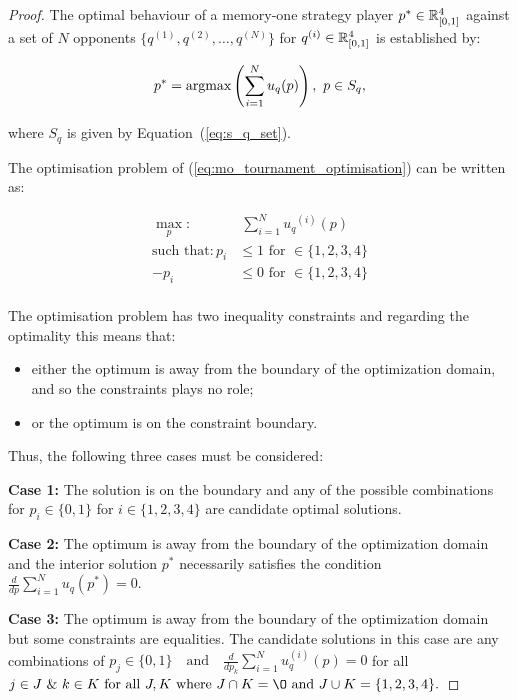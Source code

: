\begin{proof}
The optimal behaviour of a memory-one strategy player
\(p^* \in \mathbb{R}_{[0, 1]} ^ 4\)
against a set of \(N\) opponents \(\{q^{(1)}, q^{(2)}, \dots, q^{(N)} \}\)
for \(q^{(i)} \in \mathbb{R}_{[0, 1]} ^ 4\) is established by:

\[p^* = \textnormal{argmax}\left(\sum\limits_{i=1} ^ N  u_q(p)\right), \ p \in S_q,\]

where \(S_q\) is given by Equation~(\ref{eq:s_q_set}).

The optimisation problem of (\ref{eq:mo_tournament_optimisation}) can be
written as:

\begin{equation}\label{eq:mo_tournament_optimisation_standard}
    \begin{aligned}
    \max_p: & \ \sum_{i=1} ^ {N} {u_q}^{(i)} (p)
    \\
    \text{such that}: p_i & \leq 1 \text{ for } \in \{1, 2, 3, 4\} \\
    - p_i & \leq 0 \text{ for } \in \{1, 2, 3, 4\} \\
    \end{aligned}
\end{equation}

The optimisation problem has two inequality constraints and regarding the optimality
this means that:

\begin{itemize}
    \item either the optimum is away from the boundary of the optimization domain, and so the constraints plays no role;
    \item or the optimum is on the constraint boundary.
\end{itemize}

Thus, the following three cases must be considered:

\textbf{Case 1:} The solution is on the boundary and any of the possible
combinations for $p_i \in \{0, 1\}$ for $i \in \{1, 2, 3, 4\}$ are candidate
optimal solutions.

\textbf{Case 2:} The optimum is away from the boundary of the optimization domain
and the interior solution $p^*$ necessarily satisfies the condition
\(\frac{d}{dp} \sum\limits_{i=1} ^ N  u_q(p^*) = 0\).

\textbf{Case 3:} The optimum is away from the boundary of the optimization domain
but some constraints are equalities. The candidate solutions in this case
are any combinations of $p_j \in \{0, 1\} \quad \text{and} \quad \frac{d}{dp_k} 
\sum\limits_{i=1} ^ N  u_q^{(i)}(p) = 0$ 
for all $ j \in J \text{ \& } k \in K \text{ for all } J, K
\text{ where } J \cap K = \O \text{ and } J \cup K = \{1, 2, 3, 4\}.$


\end{proof}
